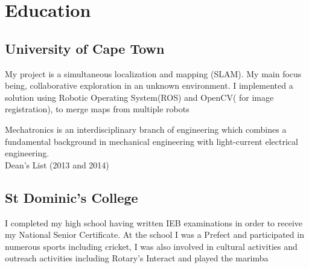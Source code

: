\documentclass[]{deedy-resume-openfont}
\begin{document}
%
%
\lastupdated

%
%



%
%

\begin{minipage}[t]{0.33\textwidth} 


\section{Education} 

\subsection{University of Cape Town}
My project is a simultaneous localization and mapping (SLAM). My main focus being, collaborative exploration in an unknown environment. I implemented a solution using Robotic Operating System(ROS) and OpenCV( for image registration), to merge maps from multiple robots \\
\sectionsep


Mechatronics is an interdisciplinary branch of engineering which combines a fundamental background in mechanical engineering with light-current electrical engineering. \\
Dean's List (2013 and 2014) \\
\sectionsep

\subsection{St Dominic's College}
I completed my high school having written IEB examinations in order to receive my National Senior Certificate. At the school I was a Prefect and participated in numerous sports including cricket, I was also involved in cultural activities and outreach activities including Rotary’s Interact and played the marimba \\
\sectionsep


\end{minipage}
\end{document}

